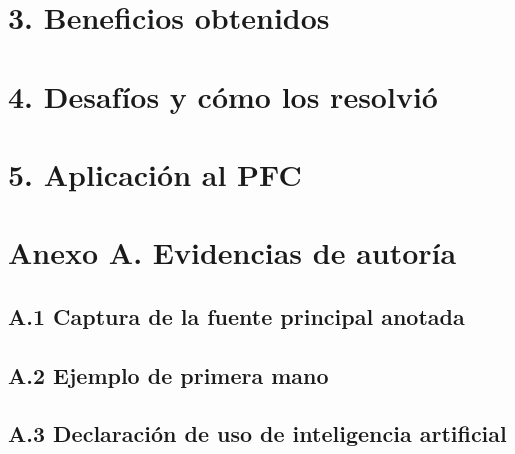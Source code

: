 \documentclass[11pt,a4paper]{article}
\begin{document}
\section*{3. Beneficios obtenidos}

\section*{4. Desafíos y cómo los resolvió}

\section*{5. Aplicación al PFC}

\newpage
\printbibliography[title={Referencias}]

\newpage
\section*{Anexo A. Evidencias de autoría}

\subsection*{A.1 Captura de la fuente principal anotada}

\subsection*{A.2 Ejemplo de primera mano}

\subsection*{A.3 Declaración de uso de inteligencia artificial}
\end{document}
